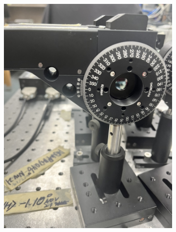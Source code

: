 \documentclass{paper}[11pt]
\begin{document}
\begin{figure}
    \centering
    \begin{subfigure}{0.45\linewidth}
        \centering
        \includegraphics[width=1\linewidth, angle = -90]{figs/thorlabs_zero.jpg}
        \caption{}
        \label{fig:thorlabs_zero}
    \end{subfigure}
    \begin{subfigure}{0.45\linewidth}
        \centering

\end{subfigure}
\end{figure}
\end{document}
